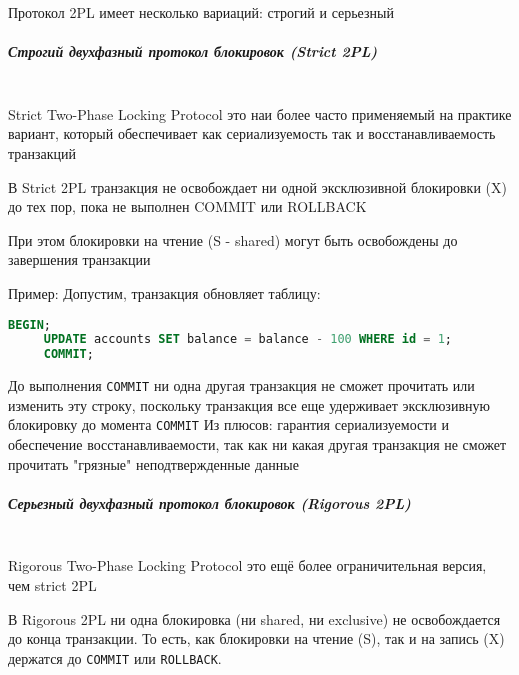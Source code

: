  Протокол 2PL имеет несколько вариаций: строгий и серьезный
 
 \subparagraph{Строгий двухфазный протокол блокировок (Strict 2PL)} ~\\
 
 Strict Two-Phase Locking Protocol это наи более часто применяемый на практике вариант, который обеспечивает как сериализуемость так и восстанавливаемость транзакций
 
 \begin{grayquote}
     В Strict 2PL транзакция не освобождает ни одной эксклюзивной блокировки (X) до тех пор, пока не выполнен COMMIT или ROLLBACK \autocite{Silberschatz}
 \end{grayquote}
 
 При этом блокировки на чтение (S - shared) могут быть освобождены до завершения транзакции
 
 Пример:
 Допустим, транзакция обновляет таблицу:
 
 \begin{lstlisting}[language=SQL]
     BEGIN;
     UPDATE accounts SET balance = balance - 100 WHERE id = 1;
     COMMIT;    
 \end{lstlisting}
 До выполнения \texttt{COMMIT} ни одна другая транзакция не сможет прочитать или изменить эту строку, поскольку транзакция все еще удерживает эксклюзивную блокировку до момента \texttt{COMMIT}
 Из плюсов: гарантия сериализуемости и обеспечение восстанавливаемости, так как ни какая другая транзакция не сможет прочитать "грязные" неподтвержденные данные
 
 \subparagraph{Серьезный двухфазный протокол блокировок (Rigorous 2PL)} ~\\
 
 Rigorous Two-Phase Locking Protocol это ещё более ограничительная версия, чем strict 2PL \autocite{Silberschatz}
 
 \begin{grayquote}
     В Rigorous 2PL ни одна блокировка (ни shared, ни exclusive) не освобождается до конца транзакции. 
     То есть, как блокировки на чтение (S), так и на запись (X) держатся до \texttt{COMMIT} или \texttt{ROLLBACK}. \autocite{Silberschatz}
 \end{grayquote}
 
